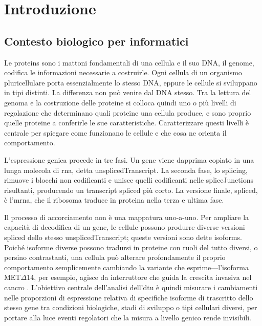 \chapter{Introduzione}

\section{Contesto biologico per informatici}
Le \glspl{protein} sono i mattoni fondamentali di una cellula e il suo DNA, il \gls{genome}, codifica le informazioni necessarie a costruirle. Ogni cellula di un organismo pluricellulare porta essenzialmente lo stesso DNA, eppure le cellule si sviluppano in tipi distinti. La differenza non può venire dal DNA stesso. Tra la lettura del genoma e la costruzione delle proteine si colloca quindi uno o più livelli di regolazione che determinano quali proteine una cellula produce, e sono proprio quelle proteine a conferirle le sue caratteristiche. Caratterizzare questi livelli è centrale per spiegare come funzionano le cellule e che cosa ne orienta il comportamento.

L'espressione genica procede in tre fasi. Un \gls{gene} viene dapprima copiato in una lunga molecola di \gls{rna}, detta \gls{unsplicedTranscript}. La seconda fase, lo \gls{splicing}, rimuove i blocchi non codificanti e unisce quelli codificanti nelle \glspl{spliceJunction} risultanti, producendo un \gls{transcript} spliced più corto. La versione finale, spliced, è l'\gls{mrna}, che il ribosoma traduce in proteina nella terza e ultima fase.

Il processo di accorciamento non è una mappatura uno-a-uno. Per ampliare la capacità di decodifica di un gene, le cellule possono produrre diverse versioni spliced dello stesso \gls{unsplicedTranscript}; queste versioni sono dette \glspl{isoform}. Poiché isoforme diverse possono tradursi in proteine con ruoli del tutto diversi, o persino contrastanti, una cellula può alterare profondamente il proprio comportamento semplicemente cambiando la variante che esprime---l'isoforma MET$\Delta$14, per esempio, agisce da interruttore che guida la crescita invasiva nel cancro \cite{cerqua2022met}. L'obiettivo centrale dell'analisi dell'\gls{dtu} è quindi misurare i cambiamenti nelle proporzioni di espressione relativa di specifiche isoforme di trascritto dello stesso gene tra condizioni biologiche, stadi di sviluppo o tipi cellulari diversi, per portare alla luce eventi regolatori che la misura a livello genico rende invisibili.

